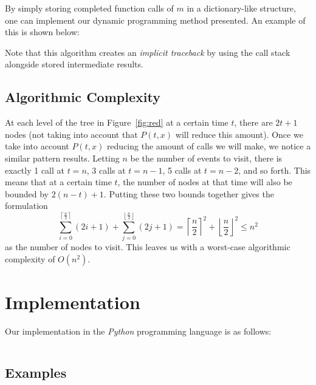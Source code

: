 \documentclass[titlepage,12pt]{article}
\let\le=\leqslant
\begin{document}
By simply storing completed function calls of $m$ in a dictionary-like
structure, one can implement our dynamic programming method presented. An
example of this is shown below:

\begin{algorithm}
\begin{algorithmic}
    \Else
    \EndIf
    \EndFunction
\end{algorithmic}
\end{algorithm}

Note that this algorithm creates an \emph{implicit traceback} by using the call
stack alongside stored intermediate results.

\subsection{Algorithmic Complexity}

At each level of the tree in Figure~\ref{fig:red} at a certain time $t$, there
are $2t + 1$ nodes (not taking into account that $P(t, x)$ will reduce this
amount). Once we take into account $P(t, x)$ reducing the amount of calls we
will make, we notice a similar pattern results. Letting $n$ be the number of
events to visit, there is exactly 1 call at $t = n$, 3 calls at $t = n -1$, 5
calls at $t = n - 2$, and so forth. This means that at a certain time $t$, the
number of nodes at that time will also be bounded by $2(n - t) + 1$. Putting
these two bounds together gives the formulation
\begin{displaymath}
    \sum_{i=0}^{\left\lceil \frac{n}{2} \right\rceil} (2i + 1) +
    \sum_{j=0}^{\left\lfloor \frac{n}{2} \right\rfloor} (2j + 1) =
    {\left\lceil\frac{n}{2}\right\rceil}^2 +
    {\left\lfloor\frac{n}{2}\right\rfloor}^2 \le n^2
\end{displaymath}
as the number of nodes to visit. This leaves us with a worst-case algorithmic
complexity of $O(n^2)$.

\section{Implementation}

Our implementation in the \emph{Python} programming language is as follows:

\inputminted{python3}{dp.py}

\subsection{Examples}


\end{document}
